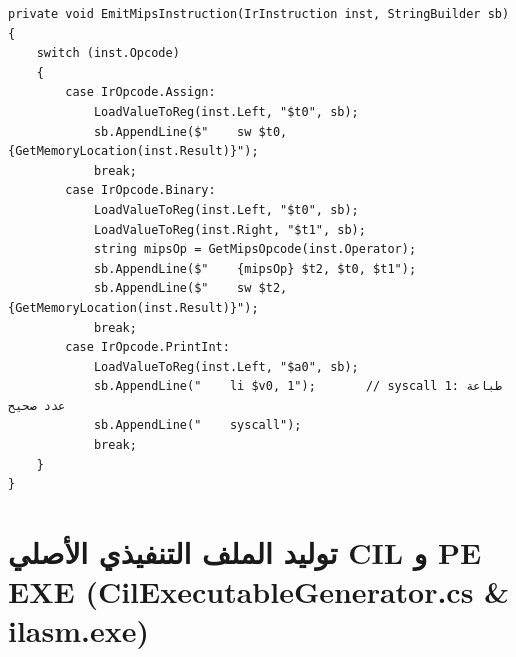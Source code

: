 \documentclass[12pt,a4paper]{report}
\begin{document}
\begin{lstlisting}[language={[Sharp]C}, caption={مقتطف حقيقي من توليد شفرة لغة التجميع MipsCodeGenerator.cs}]
private void EmitMipsInstruction(IrInstruction inst, StringBuilder sb)
{
    switch (inst.Opcode)
    {
        case IrOpcode.Assign:
            LoadValueToReg(inst.Left, "$t0", sb);
            sb.AppendLine($"    sw $t0, {GetMemoryLocation(inst.Result)}");
            break;
        case IrOpcode.Binary:
            LoadValueToReg(inst.Left, "$t0", sb);
            LoadValueToReg(inst.Right, "$t1", sb);
            string mipsOp = GetMipsOpcode(inst.Operator);
            sb.AppendLine($"    {mipsOp} $t2, $t0, $t1");
            sb.AppendLine($"    sw $t2, {GetMemoryLocation(inst.Result)}");
            break;
        case IrOpcode.PrintInt:
            LoadValueToReg(inst.Left, "$a0", sb);
            sb.AppendLine("    li $v0, 1");       // syscall 1: طباعة عدد صحيح
            sb.AppendLine("    syscall");
            break;
    }
}
\end{lstlisting}

\newpage

\section{توليد الملف التنفيذي الأصلي CIL و PE EXE (CilExecutableGenerator.cs \& ilasm.exe)}
\end{document}
